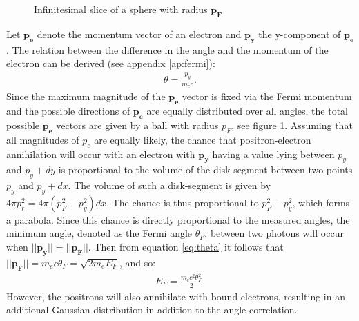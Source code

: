 \begin{figure}[H]
\centering
\resizebox{0.75\columnwidth}{!}{}
\caption{Infinitesimal slice of a sphere with radius $\boldsymbol{p_F}$}
\label{fig:FermiBall}
\end{figure} Let $\boldsymbol{p_e}$ denote the momentum vector of an electron and $\boldsymbol{p_y}$ the y-component of $\boldsymbol{p_e}$. The relation between the difference in the angle and the momentum of the electron can be derived (see appendix \ref{ap:fermi}):
\begin{gather}\label{eq:theta}
\theta = \frac{p_y}{m_ec}.
\end{gather} 
Since the maximum magnitude of the $\boldsymbol{p_e}$ vector is fixed via the Fermi momentum and the possible directions of $\boldsymbol{p_e}$ are equally distributed over all angles, the total possible $\boldsymbol{p_e}$ vectors are given by a ball with radius $p_F$, see figure \ref{fig:FermiBall}. Assuming that all magnitudes of $p_e$ are equally likely, the chance that positron-electron annihilation will occur with an electron with $\boldsymbol{p_y}$ having a value lying between $p_y$ and $p_y+dy$ is proportional to the volume of the disk-segment between two points $p_y$ and $p_y+dx$. The volume of such a disk-segment is given by $4\pi p_r^2=4\pi (p_F^2-p_y^2)dx$. The chance is thus proportional to $p_F^2-p_y^2$, which forms a parabola. Since this chance is directly proportional to the measured angles, the minimum angle, denoted as the Fermi angle $\theta_{F}$, between two photons will occur when $||\boldsymbol{p_y}||=||\boldsymbol{p_F}||$. Then from equation \ref{eq:theta} it follows that $||\boldsymbol{p_F}||=m_ec\theta_{F}= \sqrt{2m_eE_F}$, and so:
\begin{gather}
E_F = \frac{m_ec^2\theta_{F}^2}{2}.
\end{gather} However, the positrons will also annihilate with bound electrons, resulting in an additional Gaussian distribution in addition to the angle correlation.